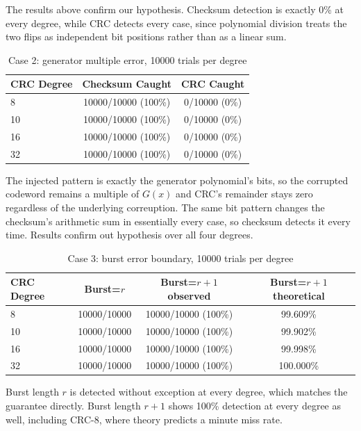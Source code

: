 \documentclass[10pt]{article}
\begin{document}
The results above confirm our hypothesis. Checksum detection is exactly 0\% at every degree, while CRC
detects every case, since polynomial division treats the two flips as
independent bit positions rather than as a linear sum.

\begin{table}[H]
\centering
\begin{tabular}{lcc}
\toprule
CRC Degree & Checksum Caught & CRC Caught \\
\midrule
8  & 10000/10000 (100\%) & 0/10000 (0\%) \\
10 & 10000/10000 (100\%) & 0/10000 (0\%) \\
16 & 10000/10000 (100\%) & 0/10000 (0\%) \\
32 & 10000/10000 (100\%) & 0/10000 (0\%) \\
\bottomrule
\end{tabular}
\caption{Case 2: generator multiple error, 10000 trials per degree}
\end{table}

The injected pattern is exactly the generator polynomial's bits, so the corrupted codeword
remains a multiple of $G(x)$ and CRC's remainder stays zero regardless
of the underlying correuption. The same bit pattern changes the checksum's
arithmetic sum in essentially every case, so checksum detects it
every time. Results confirm out hypothesis over all four degrees.

\begin{table}[H]
\centering
\begin{tabular}{lccc}
\toprule
CRC Degree & Burst=$r$ & Burst=$r{+}1$ observed & Burst=$r{+}1$ theoretical \\
\midrule
8  & 10000/10000 & 10000/10000 (100\%) & 99.609\% \\
10 & 10000/10000 & 10000/10000 (100\%) & 99.902\% \\
16 & 10000/10000 & 10000/10000 (100\%) & 99.998\% \\
32 & 10000/10000 & 10000/10000 (100\%) & 100.000\% \\
\bottomrule
\end{tabular}
\caption{Case 3: burst error boundary, 10000 trials per degree}
\end{table}

Burst length $r$ is detected without exception at every degree, which
matches the guarantee directly. Burst length $r+1$ shows 100\%
detection at every degree as well, including CRC-8, where theory predicts a
minute miss rate.
\end{document}
